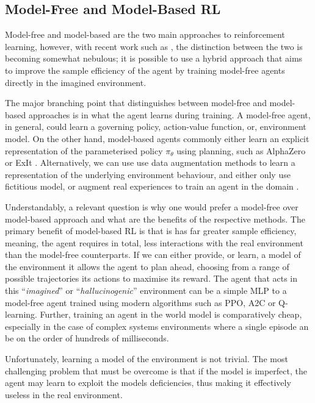 \subsection{Model-Free and Model-Based RL}

Model-free and model-based are the two main approaches to reinforcement learning, however, with recent work such as \cite{app10196685, kaiser2020modelbased, robine2021smaller}, the distinction between the two is becoming somewhat nebulous; it is possible to use a hybrid approach that aims to improve the sample efficiency of the agent by training model-free agents directly in the imagined environment.

The major branching point that distinguishes between model-free and model-based approaches is in what the agent learns during training. A model-free agent, in general, could learn a governing policy, action-value function, or, environment model. On the other hand, model-based agents commonly either learn an explicit representation of the parameterised policy $\pi_\theta$ using planning, such as AlphaZero \cite{silver2017mastering} or ExIt \cite{anthony2017thinking}. Alternatively, we can use use data augmentation methods to learn a representation of the underlying environment behaviour, and either only use fictitious model, or augment real experiences to train an agent in the domain \cite{kaiser2020modelbased, feinberg2018modelbased, freeman2019learning}.

Understandably, a relevant question is why one would prefer a model-free over model-based approach and what are the benefits of the respective methods. The primary benefit of model-based RL is that is has far greater sample efficiency, meaning, the agent requires in total, less interactions with the real environment than the model-free counterparts. If we can either provide, or learn, a model of the environment it allows the agent to plan ahead, choosing from a range of possible trajectories its actions to maximise its reward. The agent that acts in this ``\textit{imagined}'' or ``\textit{hallucinogenic}'' environment can be a simple MLP \cite{ha2018worldmodels} to a model-free agent trained using modern algorithms such as PPO, A2C or Q-learning. Further, training an agent in the world model is comparatively cheap, especially in the case of complex systems environments where a single episode an be on the order of hundreds of milliseconds.

Unfortunately, learning a model of the environment is not trivial. The most challenging problem that must be overcome is that if the model is imperfect, the agent may learn to exploit the models deficiencies, thus making it effectively useless in the real environment.

